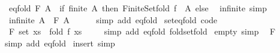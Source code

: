 \begin{isabellebody}
\isanewline
\ \ eq{\isacharunderscore}{\kern0pt}fold{\isacharcolon}{\kern0pt}\ {\isachardoublequoteopen}F\ A\ {\isacharequal}{\kern0pt}\ {\isacharparenleft}{\kern0pt}if\ finite\ A\ then\ Finite{\isacharunderscore}{\kern0pt}Set{\isachardot}{\kern0pt}fold\ f\ \isactrlbold {\isasymtop}\ A\ else\ \isactrlbold {\isasymbottom}{\isacharparenright}{\kern0pt}{\isachardoublequoteclose}\isanewline
\isanewline
{}\isamarkupfalse%
\ infinite\ {\isacharbrackleft}{\kern0pt}simp{\isacharbrackright}{\kern0pt}{\isacharcolon}{\kern0pt}\isanewline
\ \ {\isachardoublequoteopen}infinite\ A\ {\isasymLongrightarrow}\ F\ A\ {\isacharequal}{\kern0pt}\ \isactrlbold {\isasymbottom}{\isachardoublequoteclose}\isanewline
%
\isadelimproof
\ \ %
\endisadelimproof
%
\isatagproof
{}\isamarkupfalse%
\ {\isacharparenleft}{\kern0pt}simp\ add{\isacharcolon}{\kern0pt}\ eq{\isacharunderscore}{\kern0pt}fold{\isacharparenright}{\kern0pt}%
\endisatagproof
{\isafoldproof}%
%
\isadelimproof
\isanewline
%
\endisadelimproof
\isanewline
{}\isamarkupfalse%
\ set{\isacharunderscore}{\kern0pt}eq{\isacharunderscore}{\kern0pt}fold\ {\isacharbrackleft}{\kern0pt}code{\isacharbrackright}{\kern0pt}{\isacharcolon}{\kern0pt}\isanewline
\ \ {\isachardoublequoteopen}F\ {\isacharparenleft}{\kern0pt}set\ xs{\isacharparenright}{\kern0pt}\ {\isacharequal}{\kern0pt}\ fold\ f\ xs\ \isactrlbold {\isasymtop}{\isachardoublequoteclose}\isanewline
%
\isadelimproof
\ \ %
\endisadelimproof
%
\isatagproof
{}\isamarkupfalse%
\ {\isacharparenleft}{\kern0pt}simp\ add{\isacharcolon}{\kern0pt}\ eq{\isacharunderscore}{\kern0pt}fold\ fold{\isacharunderscore}{\kern0pt}set{\isacharunderscore}{\kern0pt}fold{\isacharparenright}{\kern0pt}%
\endisatagproof
{\isafoldproof}%
%
\isadelimproof
\isanewline
%
\endisadelimproof
\isanewline
{}\isamarkupfalse%
\ empty\ {\isacharbrackleft}{\kern0pt}simp{\isacharbrackright}{\kern0pt}{\isacharcolon}{\kern0pt}\isanewline
\ \ {\isachardoublequoteopen}F\ {\isacharbraceleft}{\kern0pt}{\isacharbraceright}{\kern0pt}\ {\isacharequal}{\kern0pt}\ \isactrlbold {\isasymtop}{\isachardoublequoteclose}\isanewline
%
\isadelimproof
\ \ %
\endisadelimproof
%
\isatagproof
{}\isamarkupfalse%
\ {\isacharparenleft}{\kern0pt}simp\ add{\isacharcolon}{\kern0pt}\ eq{\isacharunderscore}{\kern0pt}fold{\isacharparenright}{\kern0pt}%
\endisatagproof
{\isafoldproof}%
%
\isadelimproof
\isanewline
%
\endisadelimproof
\isanewline
{}\isamarkupfalse%
\ insert\ {\isacharbrackleft}{\kern0pt}simp{\isacharbrackright}{\kern0pt}{\isacharcolon}{\kern0pt}\isanewline

\end{isabellebody}
